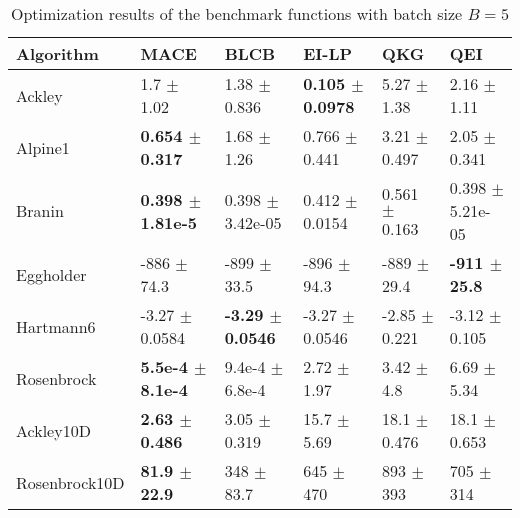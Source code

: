 \documentclass{article}
\begin{document}
\begin{table*}[!htb]
    \centering
    \caption{Optimization results of the benchmark functions with batch size $B=5$}
    \label{tab:result_analytical_b5}
    \begin{tabular}{llllll}
        \toprule
        Algorithm     & MACE                          & BLCB                       & EI-LP                        & QKG                    & QEI                      \\
        \midrule
        Ackley        & 1.7            $\pm$  1.02     &  1.38          $\pm$  0.836    &  \textbf{0.105 $\pm$  0.0978} &  5.27   $\pm$  1.38   &  2.16         $\pm$  1.11  \\
        Alpine1       & \textbf{0.654  $\pm$  0.317}   &  1.68          $\pm$  1.26     &  0.766         $\pm$  0.441   &  3.21   $\pm$  0.497  &  2.05         $\pm$  0.341 \\
        Branin        & \textbf{0.398  $\pm$  1.81e-5} &  0.398         $\pm$  3.42e-05 &  0.412         $\pm$  0.0154  &  0.561  $\pm$  0.163  &  0.398        $\pm$  5.21e-05 \\
        Eggholder     & -886           $\pm$  74.3     &  -899          $\pm$  33.5     &  -896          $\pm$  94.3    &  -889   $\pm$  29.4   &  \textbf{-911 $\pm$  25.8}  \\
        Hartmann6     & -3.27          $\pm$  0.0584   &  \textbf{-3.29 $\pm$  0.0546}  &  -3.27         $\pm$  0.0546  &  -2.85  $\pm$  0.221  &  -3.12        $\pm$  0.105 \\
        Rosenbrock    & \textbf{5.5e-4 $\pm$  8.1e-4}  &  9.4e-4        $\pm$  6.8e-4   &  2.72          $\pm$  1.97    &  3.42   $\pm$  4.8    &  6.69         $\pm$  5.34  \\
        Ackley10D     & \textbf{2.63   $\pm$  0.486}   &  3.05          $\pm$  0.319    &  15.7          $\pm$  5.69    &  18.1   $\pm$  0.476  &  18.1         $\pm$  0.653 \\
        Rosenbrock10D & \textbf{81.9   $\pm$  22.9}    &  348           $\pm$  83.7     &  645           $\pm$  470     &  893    $\pm$  393    &  705          $\pm$  314   \\
        \bottomrule
    \end{tabular}
\end{table*}

% 
% 
% 
% 
% 
% 





\end{document}
